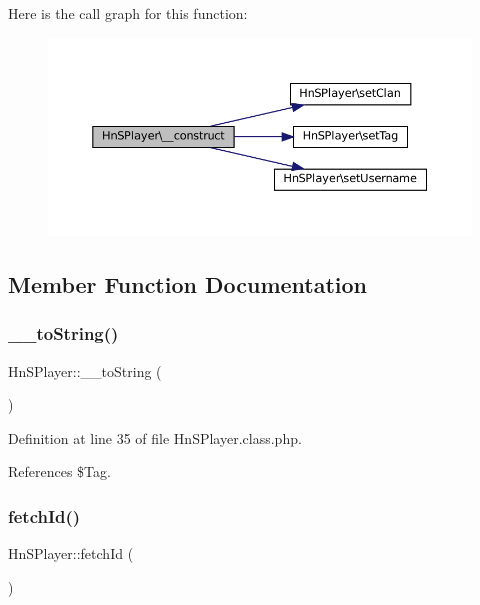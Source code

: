 Here is the call graph for this function\+:\nopagebreak
\begin{figure}[H]
\begin{center}
\leavevmode
\includegraphics[width=350pt]{class_hn_s_player_a141a1116dc074bc7663af54af20ae922_cgraph}
\end{center}
\end{figure}


\subsection{Member Function Documentation}
\mbox{\label{class_hn_s_player_acd155aa0574b72c8b59a92b1d8412eb6}} 
\subsubsection{\texorpdfstring{\+\_\+\+\_\+to\+String()}{\_\_toString()}}
{\footnotesize\ttfamily Hn\+S\+Player\+::\+\_\+\+\_\+to\+String (\begin{DoxyParamCaption}{ }\end{DoxyParamCaption})}



Definition at line 35 of file Hn\+S\+Player.\+class.\+php.



References \$\+Tag.

\mbox{\label{class_hn_s_player_a2db791a389d27e0bf349916089d07294}} 
\subsubsection{\texorpdfstring{fetch\+Id()}{fetchId()}}
{\footnotesize\ttfamily Hn\+S\+Player\+::fetch\+Id (\begin{DoxyParamCaption}{ }\end{DoxyParamCaption})\hspace{0.3cm}{\ttfamily [private]}}



